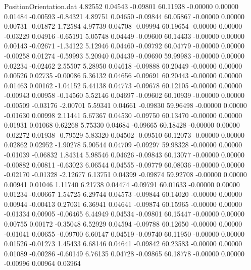 \begin{filecontents}{PositionOrientation.dat}
   4.82552    0.04543   -0.09801    60.11938   -0.00000    0.00000    0.01484   -0.00593   -0.84321
   4.89751    0.04650   -0.09844    60.05867   -0.00000    0.00000    0.00731   -0.01872    1.72584
   4.97739    0.04708   -0.09994    60.19654   -0.00000    0.00000   -0.03229    0.04916   -0.65191
   5.05748    0.04449   -0.09600    60.14433   -0.00000    0.00000    0.00143   -0.02671   -1.34122
   5.12946    0.04460   -0.09792    60.04779   -0.00000    0.00000   -0.00258    0.01274   -0.59993
   5.20940    0.04439   -0.09690    59.99983   -0.00000    0.00000    0.02234   -0.02462    2.55507
   5.28950    0.04618   -0.09888    60.20449   -0.00000    0.00000    0.00526    0.02735   -0.00086
   5.36132    0.04656   -0.09691    60.20443   -0.00000    0.00000    0.01463    0.00162   -1.04152
   5.44138    0.04773   -0.09678    60.12105   -0.00000    0.00000   -0.00943    0.00958   -0.14560
   5.52146    0.04697   -0.09602    60.10939   -0.00000    0.00000   -0.00509   -0.03176   -2.00701
   5.59341    0.04661   -0.09830    59.96498   -0.00000    0.00000   -0.01630    0.00998    2.11441
   5.67367    0.04530   -0.09750    60.13470   -0.00000    0.00000    0.01931    0.01068    0.62268
   5.75330    0.04684   -0.09665    60.18428   -0.00000    0.00000   -0.02272    0.01938   -0.79529
   5.83320    0.04502   -0.09510    60.12073   -0.00000    0.00000    0.02862    0.02952   -1.90278
   5.90544    0.04709   -0.09297    59.98328   -0.00000    0.00000   -0.01039   -0.06832    1.84314
   5.98546    0.04626   -0.09843    60.13077   -0.00000    0.00000   -0.00882    0.00811   -0.63023
   6.06544    0.04555   -0.09779    60.08036   -0.00000    0.00000   -0.02170   -0.01328   -2.12677
   6.13751    0.04399   -0.09874    59.92708   -0.00000    0.00000    0.00941    0.01046    1.11740
   6.21738    0.04474   -0.09791    60.01633   -0.00000    0.00000    0.01234   -0.00667    1.54725
   6.29744    0.04573   -0.09844    60.14020   -0.00000    0.00000    0.00944   -0.00413    0.27031
   6.36941    0.04641   -0.09874    60.15965   -0.00000    0.00000   -0.01334    0.00905   -0.06465
   6.44949    0.04534   -0.09801    60.15447   -0.00000    0.00000    0.00755    0.00172   -0.35048
   6.52929    0.04594   -0.09788    60.12650   -0.00000    0.00000   -0.01041    0.00655   -0.09700
   6.60147    0.04519   -0.09740    60.11950   -0.00000    0.00000    0.01526   -0.01273    1.45433
   6.68146    0.04641   -0.09842    60.23583   -0.00000    0.00000    0.01089   -0.00286   -0.60149
   6.76135    0.04728   -0.09865    60.18778   -0.00000    0.00000   -0.00996    0.00964    0.03964

\end{filecontents}
